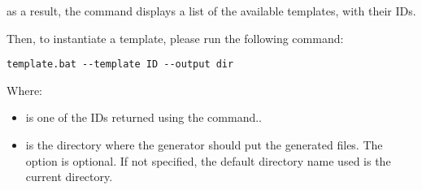 \noindent as a result, the command displays a list of the available
templates, with their IDs.

Then, to instantiate a template, please run the following command:

\begin{lstlisting}
template.bat --template ID --output dir
\end{lstlisting}

\noindent Where:
\begin{itemize}
\item {} is one of the IDs returned using the  command..
\item {} is the directory where the generator should put the
  generated files. The  option is optional. If not
  specified, the default directory name used is the current directory.
\end{itemize}
